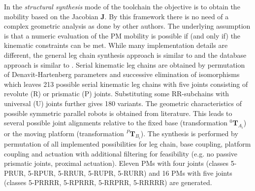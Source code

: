 \documentclass[
	graybox,
	vecphys] %
	{svmult}
\newcommand{\bm}[1]{\boldsymbol{#1}}
\newcommand{\trmat}[2]{{{ }^{#1}\boldsymbol{T}}_{#2}}
\begin{document}
In the \emph{structural synthesis} mode of the toolchain 
the objective is to obtain the mobility based on the Jacobian $\bm{J}$.
%
%
By this framework there is no need of a complex geometric analysis as done by other authors.
The underlying assumption is that a numeric evaluation of the PM mobility is possible if (and only if) the kinematic constraints can be met.
%
%
While many implementation details are different, the general leg chain synthesis approach is similar to \cite{Gogu2008} and the database approach is similar to \cite{DingCaoCaiKec2015}.
Serial kinematic leg chains are obtained by permutation of Denavit-Hartenberg parameters and successive elimination of isomorphisms which leaves 213 possible serial kinematic leg chains with five joints consisting of revolute (R) or prismatic (P) joints.
Substituting some RR-subchains with universal (U) joints further gives 180 variants.
The geometric characteristics of possible symmetric parallel robots is obtained from literature.
This leads to several possible joint alignments relative to the fixed base (transformation $\trmat{0}{A_i}$) or the moving platform (transformation $\trmat{P}{B_i}$). %
The synthesis is performed by permutation of all implemented possibilities for leg chain, base coupling, platform coupling and actuation with additional filtering for feasibility (e.g. no passive prismatic joints, proximal actuation). %
Eleven PMs with four joints (classes 5-PRUR, 5-RPUR, 5-RRUR, 5-RUPR, 5-RURR) and 16 PMs with five joints (classes 5-PRRRR, 5-RPRRR, 5-RRPRR, 5-RRRRR) are generated.
\end{document}
